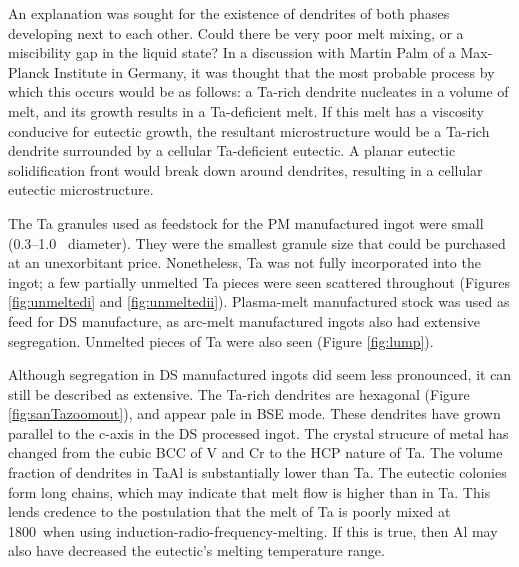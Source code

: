 An explanation was sought for the existence of dendrites of both phases developing next to each other.  Could there be very poor melt mixing, or a miscibility gap in the liquid state?  In a discussion with Martin Palm of a Max-Planck Institute in Germany, it was thought that the most probable process by which this occurs would be as follows: a Ta-rich dendrite nucleates in a volume of melt, and its growth results in a Ta-deficient melt.  If this melt has a viscosity conducive for eutectic growth, the resultant microstructure would be a Ta-rich dendrite surrounded by a cellular Ta-deficient eutectic.  A planar eutectic solidification front would break down around dendrites, resulting in a cellular eutectic microstructure.

The Ta granules used as feedstock for the PM manufactured ingot were small (0.3--1.0 \centi\metre\ diameter).  They were the smallest granule size that could be purchased at an unexorbitant price.  Nonetheless, Ta was not fully incorporated into the ingot; a few partially unmelted Ta pieces were seen scattered throughout (Figures \ref{fig:unmeltedi} and \ref{fig:unmeltedii}).  Plasma-melt manufactured stock was used as feed for DS manufacture, as arc-melt manufactured ingots also had extensive segregation.  Unmelted pieces of Ta were also seen (Figure \ref{fig:lump}). 

Although segregation in DS manufactured ingots did seem less pronounced, it can still be described as extensive.  The Ta-rich dendrites are hexagonal (Figure \ref{fig:sanTazoomout}), and appear pale in BSE mode.  These dendrites have grown parallel to the c-axis in the DS processed ingot.  The crystal strucure of metal has changed from the cubic BCC of V and Cr to the HCP nature of Ta.  The volume fraction of dendrites in TaAl is substantially lower than Ta.  The eutectic colonies form long chains, which may indicate that melt flow is higher than in Ta.  This lends credence to the postulation that the melt of Ta is poorly mixed at 1800\celsius\ when using induction-radio-frequency-melting.  If this is true, then Al may also have decreased the eutectic's melting temperature range. 

